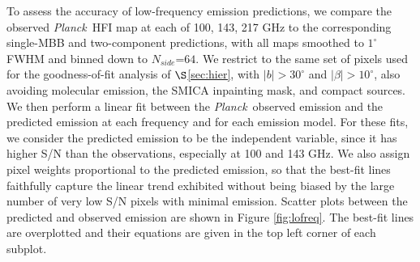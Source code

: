 \documentclass{emulateapj}
\newcommand{\PLANCK}{{\it Planck}}
\begin{document}
\begin{figure*}
\begin{center}
\caption{\label{fig:lofreq} Comparison between low-frequency thermal dust 
emission predictions from our best-fit two-component model (Table 
\ref{tab:global}, model 2) and those of \cite{planckdust}. The top row shows
scatter plots of the \cite{planckdust} predictions versus observed \PLANCK~100 
GHz (left), \PLANCK~143 GHz (center) and \PLANCK~217 GHz (right). The bottom 
row shows scatter plots of the corresponding two-component predictions versus
\PLANCK~observations. In all cases, the blue line indicates the best-fit linear
relationship, while the red line represents a perfect match between predictions
and observations. The lines of best-fit illustrate that the single-MBB model 
systematically underpredicts emission (in the multiplicative sense) by 18.8\%, 
12.6\% and 7.9\% at 100, 143 and 217 GHz respectively. On the other hand, by 
the same metric, the two-component model predictions at 100-217 GHz are always 
accurate to within $\le$2.2\%. The two-component fit results shown are based on
217-3000 GHz observations, meaning that the 100 GHz and 143 GHz predictions are
truly extrapolations, while the 217 GHz agreement is enforced by the fitting 
process itself to some extent.}
\end{center}
\end{figure*}

To assess the accuracy of low-frequency emission predictions, we compare the 
observed \PLANCK~HFI map at each of 100, 143, 217 GHz to the corresponding 
single-MBB and two-component predictions, with all maps smoothed to $1^{\circ}$
FWHM and binned down to $N_{side}$=$64$. We restrict to the same set of pixels 
used for the goodness-of-fit analysis of $\S$\ref{sec:hier}, with 
$|b|>30^{\circ}$ and $|\beta|>10^{\circ}$, also avoiding molecular emission, 
the SMICA inpainting mask, and compact sources. We then perform a linear fit 
between the \PLANCK~observed emission and the predicted emission at each 
frequency and for each emission model. For these fits, we consider the 
predicted emission to be the independent variable, since it has higher S/N than
the observations, especially at 100 and 143 GHz. We also assign pixel weights 
proportional to the predicted emission, so that the best-fit lines faithfully 
capture the linear trend exhibited without being biased by the large number of 
very low S/N pixels with minimal emission. Scatter plots between the predicted 
and observed emission are shown in Figure \ref{fig:lofreq}. The best-fit lines 
are overplotted and their equations are given in the top left corner of each 
subplot.
\end{document}
